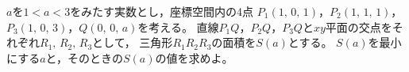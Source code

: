 \documentclass[../../main.tex]{subfiles}
\begin{document}
$a$を$1<a<3$をみたす実数とし，座標空間内の4点
$P_1(1, \, 0, \, 1)$，$P_2(1, \, 1, \, 1)$，$P_3(1, \, 0, \, 3)$，$Q(0, \, 0, \, a)$を考える。
直線$P_1Q$，$P_2Q$，$P_3Q$と$xy$平面の交点をそれぞれ$R_1, \, R_2, \, R_3$として，
三角形$R_1R_2R_3$の面積を$S(a)$とする。
$S(a)$を最小にする$a$と，そのときの$S(a)$の値を求めよ。
\end{document}
